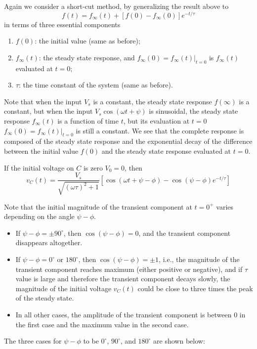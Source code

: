Again we consider a short-cut method, by generalizing the result above to 
\[
f(t)=f_{\infty}(t)+[f(0)-f_{\infty}(0)]e^{-t/\tau} 
\]
in terms of three essential components
\begin{enumerate}
\item $f(0)$: the initial value (same as before);
\item $f_{\infty}(t)$: the steady state response, and
  $f_{\infty}(0)=f_{\infty}(t)\big|_{t=0}$ is $f_{\infty}(t)$ evaluated 
  at $t=0$;
\item $\tau$: the time constant of the system (same as before).
\end{enumerate}
Note that when the input $V_s$ is a constant, the steady state response
$f(\infty)$ is a constant, but when the input $V_s\cos(\omega t+\psi)$
is sinusoidal, the steady state response $f_{\infty}(t)$ is a function of 
time $t$, but its evaluation at $t=0$ $f_{\infty}(0)=f_{\infty}(t)\big|_{t=0}$ 
is still a constant. We see that the complete response is composed of 
the steady state response and the exponential decay of the difference 
between the initial value $f(0)$ and the steady state response evaluated
at $t=0$.

If the initial voltage on $C$ is zero $V_0=0$, then
\[
v_C(t)=\frac{V_s}{\sqrt{(\omega \tau)^2+1}}[\cos(\omega t+\psi-\phi) 
-\cos(\psi-\phi) e^{-t/\tau}]	
\]

Note that the initial magnitude of the transient component at $t=0^+$
varies depending on the angle $\psi-\phi$. 
\begin{itemize}
\item If $\psi-\phi=\pm 90^\circ$, then $\cos(\psi-\phi)=0$, and the 
  transient component disappears altogether.
\item If $\psi-\phi=0^\circ$ or $180^\circ$, then $\cos(\psi-\phi)=\pm 1$,
  i.e., the magnitude of the transient component reaches maximum (either 
  positive or negative), and if $\tau$ value is large and therefore the 
  transient component decays slowly, the magnitude of the initial voltage
  $v_C(t)$ could be close to three times the peak of the steady state. 
\item In all other cases, the amplitude of the transient component is
  between 0 in the first case and the maximum value in the second case.
\end{itemize}

The three cases for $\psi-\phi$ to be $0^\circ$, $90^\circ$, and $180^\circ$
are shown below:

